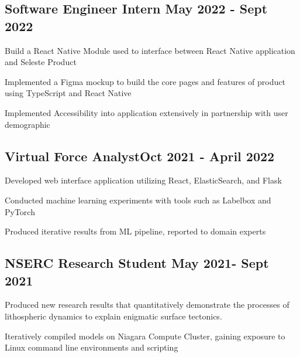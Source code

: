 \documentclass[a4paper,12pt]{article}
\begin{document}


\vspace*{10pt}
\subsection{{Software Engineer Intern }\hfill May 2022 - Sept 2022}
\begin{zitemize}
\item Build a React Native Module used to interface between React Native application and Seleste Product
\item  Implemented a Figma mockup to build the core pages and features of product using TypeScript and React Native
\item Implemented Accessibility into application extensively in partnership with user demographic
\end{zitemize}

\vspace*{3pt}
\subsection{{Virtual Force Analyst}\hfill Oct 2021 - April 2022}
\begin{zitemize}
\item Developed web interface application utilizing React, ElasticSearch, and Flask
\item Conducted machine learning experiments with tools such as Labelbox and PyTorch
\item Produced iterative results from ML pipeline, reported to domain experts
\end{zitemize}

\vspace*{3pt}
\subsection{{NSERC Research Student }\hfill May 2021- Sept 2021}
\begin{zitemize}
\item Produced new research results that quantitatively demonstrate the processes of lithospheric dynamics to explain enigmatic surface tectonics.
\item Iteratively compiled models on Niagara Compute Cluster, gaining exposure to Linux command line environments and scripting
\end{zitemize}
\end{document}
